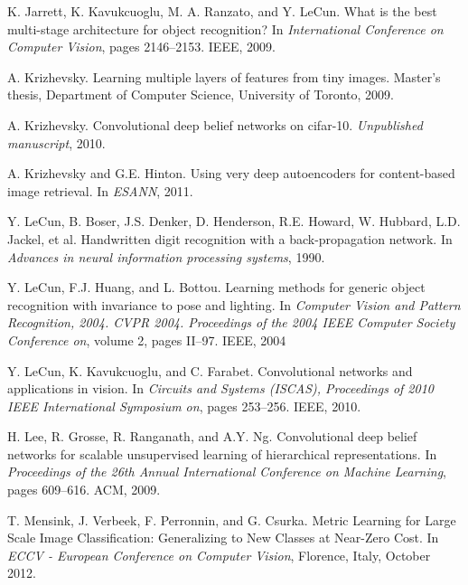 \documentclass{article} %
\begin{document}
\begin{thebibliography}{99}
K. Jarrett, K. Kavukcuoglu, M. A. Ranzato, and Y. LeCun. What is the best multi-stage architecture for
object recognition? In {\em International Conference on Computer Vision}, pages 2146–2153. IEEE, 2009.
\vspace{-1mm}

A. Krizhevsky. Learning multiple layers of features from tiny images. Master's thesis, Department of
Computer Science, University of Toronto, 2009.
\vspace{-1mm}

A. Krizhevsky. Convolutional deep belief networks on cifar-10. {\em Unpublished manuscript}, 2010.
\vspace{-1mm}

A. Krizhevsky and G.E. Hinton. Using very deep autoencoders for content-based image retrieval. In
{\em ESANN}, 2011.
\vspace{-1mm}

Y. LeCun, B. Boser, J.S. Denker, D. Henderson, R.E. Howard, W. Hubbard, L.D. Jackel, et al. Handwritten
digit recognition with a back-propagation network. In {\em Advances in neural information processing
systems}, 1990.
\vspace{-1mm}

Y. LeCun, F.J. Huang, and L. Bottou. Learning methods for generic object recognition with invariance to
pose and lighting. In {\em Computer Vision and Pattern Recognition, 2004. CVPR 2004. Proceedings of the
2004 IEEE Computer Society Conference on}, volume 2, pages II–97. IEEE, 2004
\vspace{-1mm}

Y. LeCun, K. Kavukcuoglu, and C. Farabet. Convolutional networks and applications in vision. In
{\em Circuits and Systems (ISCAS), Proceedings of 2010 IEEE International Symposium on}, pages 253–256.
IEEE, 2010.
\vspace{-1mm}

H. Lee, R. Grosse, R. Ranganath, and A.Y. Ng. Convolutional deep belief networks for scalable unsupervised
learning of hierarchical representations. In {\em Proceedings of the 26th Annual International Conference
on Machine Learning}, pages 609–616. ACM, 2009.
\vspace{-1mm}

T. Mensink, J. Verbeek, F. Perronnin, and G. Csurka. Metric Learning for Large Scale Image Classification:
Generalizing to New Classes at Near-Zero Cost. In {\em ECCV - European Conference on Computer
Vision}, Florence, Italy, October 2012.
\vspace{-1mm}


\end{thebibliography}
\end{document}
